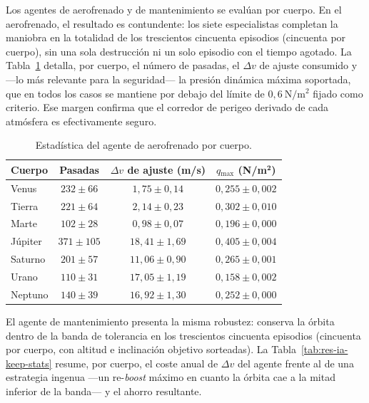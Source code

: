 Los agentes de aerofrenado y de mantenimiento se evalúan por cuerpo. En el aerofrenado, el resultado es contundente: los siete especialistas completan la maniobra en la totalidad de los trescientos cincuenta episodios (cincuenta por cuerpo), sin una sola destrucción ni un solo episodio con el tiempo agotado. La Tabla~\ref{tab:res-ia-aero-stats} detalla, por cuerpo, el número de pasadas, el $\Delta v$ de ajuste consumido y ---lo más relevante para la seguridad--- la presión dinámica máxima soportada, que en todos los casos se mantiene por debajo del límite de $0{,}6\ \mathrm{N/m^2}$ fijado como criterio. Ese margen confirma que el corredor de perigeo derivado de cada atmósfera es efectivamente seguro.

\begin{table}[htbp]
  \centering
  \caption{Estadística del agente de aerofrenado por cuerpo.}
  \label{tab:res-ia-aero-stats}
  \begin{tabular}{l c c c}
    \hline
    \textbf{Cuerpo} & \textbf{Pasadas} & {\boldmath $\Delta v$} \textbf{de ajuste (m/s)} & {\boldmath $q$}$_{\max}$ \textbf{(N/m}$^{\mathbf{2}}$\textbf{)} \\
    \hline
    Venus   & $232 \pm 66$  & $1{,}75 \pm 0{,}14$  & $0{,}255 \pm 0{,}002$ \\
    Tierra  & $221 \pm 64$  & $2{,}14 \pm 0{,}23$  & $0{,}302 \pm 0{,}010$ \\
    Marte   & $102 \pm 28$  & $0{,}98 \pm 0{,}07$  & $0{,}196 \pm 0{,}000$ \\
    Júpiter & $371 \pm 105$ & $18{,}41 \pm 1{,}69$ & $0{,}405 \pm 0{,}004$ \\
    Saturno & $201 \pm 57$  & $11{,}06 \pm 0{,}90$ & $0{,}265 \pm 0{,}001$ \\
    Urano   & $110 \pm 31$  & $17{,}05 \pm 1{,}19$ & $0{,}158 \pm 0{,}002$ \\
    Neptuno & $140 \pm 39$  & $16{,}92 \pm 1{,}30$ & $0{,}252 \pm 0{,}000$ \\
    \hline
  \end{tabular}
\end{table}

El agente de mantenimiento presenta la misma robustez: conserva la órbita dentro de la banda de tolerancia en los trescientos cincuenta episodios (cincuenta por cuerpo, con altitud e inclinación objetivo sorteadas). La Tabla~\ref{tab:res-ia-keep-stats} resume, por cuerpo, el coste anual de $\Delta v$ del agente frente al de una estrategia ingenua ---un re-\textit{boost} máximo en cuanto la órbita cae a la mitad inferior de la banda--- y el ahorro resultante.

